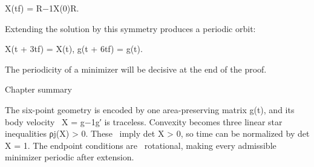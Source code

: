 X(tf) = R−1X(0)R.


Extending the solution by this symmetry produces a periodic orbit:


\begin{displaytext}
X(t + 3tf) = X(t), g(t + 6tf) = g(t).
\end{displaytext}

The periodicity of a minimizer will be decisive at the end of the proof.


\begin{insightbox}{Chapter summary}
\end{insightbox}

\begin{displaytext}
The six-point geometry is encoded by one area-preserving matrix g(t), and its body velocity \
X = g−1g′ is traceless. Convexity becomes three linear star inequalities ρj(X) > 0. These \
imply det X > 0, so time can be normalized by det X = 1. The endpoint conditions are \
rotational, making every admissible minimizer periodic after extension.
\end{displaytext}
